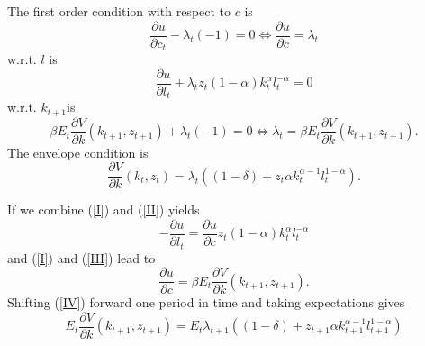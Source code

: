 \documentclass[a4paper,12pt]{article}
\begin{document}
The first order condition with respect to $c$ is%
\begin{equation}
\frac{\partial u}{\partial c_{t}}-\lambda _{t}\left( -1\right)
=0\Leftrightarrow \frac{\partial u}{\partial c}=\lambda _{t}  \label{I}
\end{equation}%
w.r.t. $l$ is%
\begin{equation}
\frac{\partial u}{\partial l_{t}}+\lambda _{t}z_{t}\left( 1-\alpha \right)
k_{t}^{\alpha }l_{t}^{-\alpha }=0  \label{II}
\end{equation}%
w.r.t. $k_{t+1}$is 
\begin{equation}
\beta E_{t}\frac{\partial V}{\partial k}\left( k_{t+1},z_{t+1}\right)
+\lambda _{t}\left( -1\right) =0\Leftrightarrow \lambda _{t}=\beta E_{t}%
\frac{\partial V}{\partial k}\left( k_{t+1},z_{t+1}\right) .  \label{III}
\end{equation}%
The envelope condition is 
\begin{equation}
\frac{\partial V}{\partial k}\left( k_{t},z_{t}\right) =\lambda _{t}\left(
\left( 1-\delta \right) +z_{t}\alpha k_{t}^{\alpha -1}l_{t}^{1-\alpha
}\right) .  \label{IV}
\end{equation}

If we combine (\ref{I}) and (\ref{II}) yields%
\begin{equation}
-\frac{\partial u}{\partial l_{t}}=\frac{\partial u}{\partial c}z_{t}\left(
1-\alpha \right) k_{t}^{\alpha }l_{t}^{-\alpha }  \label{V}
\end{equation}%
and (\ref{I}) and (\ref{III}) lead to%
\begin{equation}
\frac{\partial u}{\partial c}=\beta E_{t}\frac{\partial V}{\partial k}\left(
k_{t+1},z_{t+1}\right) .  \label{VI}
\end{equation}%
Shifting (\ref{IV}) forward one period in time and taking expectations gives%
\begin{equation}
E_{t}\frac{\partial V}{\partial k}\left( k_{t+1},z_{t+1}\right)
=E_{t}\lambda _{t+1}\left( \left( 1-\delta \right) +z_{t+1}\alpha
k_{t+1}^{\alpha -1}l_{t+1}^{1-\alpha }\right)   \label{VII}
\end{equation}
\end{document}
